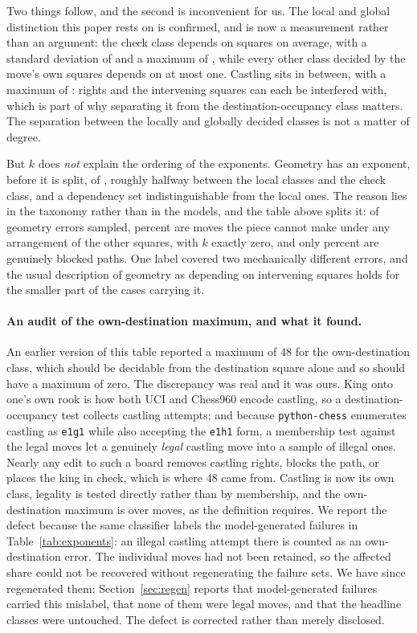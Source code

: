 \documentclass[11pt]{article}
\begin{document}
Two things follow, and the second is inconvenient for us. The local and global
distinction this paper rests on is confirmed, and is now a measurement rather than
an argument: the check class depends on  squares on average, with a
standard deviation of  and a maximum of , while every other
class decided by the move's own squares depends on at most one. Castling sits in
between, with a maximum of : rights and the intervening squares can
each be interfered with, which is part of why separating it from the
destination-occupancy class matters. The separation between the locally and globally
decided classes is not a matter of degree.

But $k$ does \emph{not} explain the ordering of the exponents. Geometry has an
exponent, before it is split, of , roughly halfway between the local
classes and the check class, and a dependency set indistinguishable from the local
ones. The reason lies in
the taxonomy rather than in the models, and the table above splits it: of
 geometry errors sampled,  percent are moves the piece cannot
make under any arrangement of the other squares, with $k$ exactly zero, and only
 percent are genuinely blocked paths. One label covered two mechanically
different errors, and the usual description of geometry as depending on intervening
squares holds for the smaller part of the cases carrying it.

\paragraph{An audit of the own-destination maximum, and what it found.}
An earlier version of this table reported a maximum of 48 for the own-destination
class, which should be decidable from the destination square alone and so should
have a maximum of zero. The discrepancy was real and it was ours. King onto one's
own rook is how both UCI and Chess960 encode castling, so a destination-occupancy
test collects castling attempts; and because \texttt{python-chess} enumerates
castling as \texttt{e1g1} while also accepting the \texttt{e1h1} form, a
membership test against the legal moves let a genuinely \emph{legal} castling move
into a sample of illegal ones. Nearly any edit to such a board removes castling
rights, blocks the path, or places the king in check, which is where 48 came from.
Castling is now its own class, legality is tested directly rather than by
membership, and the own-destination maximum is  over  moves, as the
definition requires. We report the defect because the same classifier labels the
model-generated failures in Table~\ref{tab:exponents}: an illegal castling attempt there
is counted as an own-destination error. The individual moves had not been retained, so the affected share could not be
recovered without regenerating the failure sets. We have since regenerated them:
Section~\ref{sec:regen} reports that  model-generated failures carried
this mislabel, that none of them were legal moves, and that the headline classes were
untouched. The defect is corrected rather than merely disclosed.
\end{document}
